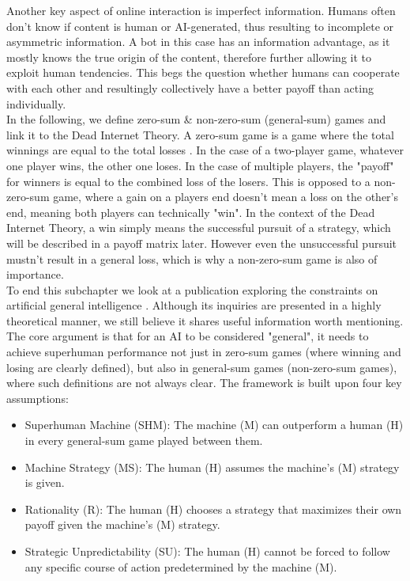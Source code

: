 \documentclass{article}
\begin{document}
Another key aspect of online interaction is imperfect information. Humans often don't know if content is human or AI-generated, thus resulting to incomplete or asymmetric information. A bot in this case has an information advantage, as it mostly knows the true origin of the content, therefore further allowing it to exploit human tendencies. This begs the question whether humans can cooperate with each other and resultingly collectively have a better payoff than acting individually.
\\
In the following, we define zero-sum \& non-zero-sum (general-sum) games and link it to the Dead Internet Theory. A zero-sum game is a game where the total winnings are equal to the total losses \cite{zero_sum_games_def}. In the case of a two-player game, whatever one player wins, the other one loses. In the case of multiple players, the "payoff" for winners is equal to the combined loss of the losers. This is opposed to a non-zero-sum game, where a gain on a players end doesn't mean a loss on the other's end, meaning both players can technically "win". In the context of the Dead Internet Theory, a win simply means the successful pursuit of a strategy, which will be described in a payoff matrix later. However even the unsuccessful pursuit mustn't result in a general loss, which is why a non-zero-sum game is also of importance. 
\\

To end this subchapter we look at a publication exploring the constraints on artificial general intelligence \cite{constraints_game_Theory_superhuman}. Although its inquiries are presented in a highly theoretical manner, we still believe it shares useful information worth mentioning. The core argument is that for an AI to be considered "general", it needs to achieve superhuman performance not just in zero-sum games (where winning and losing are clearly defined), but also in general-sum games (non-zero-sum games), where such definitions are not always clear.
The framework is built upon four key assumptions: \begin{itemize}
    \item Superhuman Machine (SHM): The machine (M) can outperform a human (H) in every general-sum game played between them.
    \item Machine Strategy (MS): The human (H) assumes the machine's (M) strategy is given.
    \item Rationality (R): The human (H) chooses a strategy that maximizes their own payoff given the machine's (M) strategy.
    \item Strategic Unpredictability (SU): The human (H) cannot be forced to follow any specific course of action predetermined by the machine (M).
\end{itemize}
\end{document}
